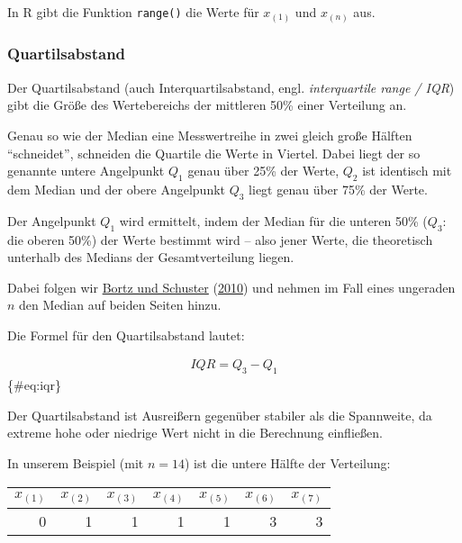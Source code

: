 \documentclass[
  ngerman,
]{article}
\begin{document}
\begin{rtip}
In R gibt die Funktion {\tt range()} die Werte für $x_{(1)}$ und $x_{(n)}$ aus.
\end{rtip}

\hypertarget{quartilsabstand}{%
\subsubsection{Quartilsabstand}\label{quartilsabstand}}

Der Quartilsabstand (auch Interquartilsabstand, engl. \emph{interquartile range / IQR}) gibt die Größe des Wertebereichs der mittleren 50\% einer Verteilung an.

Genau so wie der Median eine Messwertreihe in zwei gleich große Hälften ``schneidet'', schneiden die Quartile die Werte in Viertel. Dabei liegt der so genannte untere Angelpunkt \(Q_1\) genau über 25\% der Werte, \(Q_2\) ist identisch mit dem Median und der obere Angelpunkt \(Q_3\) liegt genau über 75\% der Werte.

Der Angelpunkt \(Q_1\) wird ermittelt, indem der Median für die unteren 50\% (\(Q_3\): die oberen 50\%) der Werte bestimmt wird -- also jener Werte, die theoretisch unterhalb des Medians der Gesamtverteilung liegen.

Dabei folgen wir \protect\hyperlink{ref-bortz}{Bortz und Schuster} (\protect\hyperlink{ref-bortz}{2010}) und nehmen im Fall eines ungeraden \(n\) den Median auf beiden Seiten hinzu.

Die Formel für den Quartilsabstand lautet:

\[
  \begin{aligned}
    \mathit{IQR}=Q_3-Q_1
  \end{aligned}
\]\{\#eq:iqr\}

Der Quartilsabstand ist Ausreißern gegenüber stabiler als die Spannweite, da extreme hohe oder niedrige Wert nicht in die Berechnung einfließen.

In unserem Beispiel (mit \(n=14\)) ist die untere Hälfte der Verteilung:

\begin{table}[H]
\centering
\begin{tabular}{rrrrrrr}
\toprule
$x_{(1)}$ & $x_{(2)}$ & $x_{(3)}$ & $x_{(4)}$ & $x_{(5)}$ & $x_{(6)}$ & $x_{(7)}$\\
\midrule
0 & 1 & 1 & 1 & 1 & 3 & 3\\
\bottomrule
\end{tabular}
\end{table}
\end{document}
